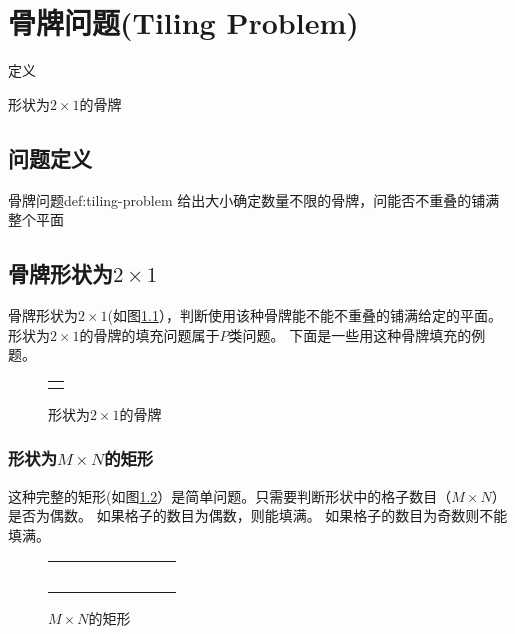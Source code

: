 \chapter{骨牌问题(Tiling Problem)}

\begin{introduction}
    \item 定义
    \item 形状为$2\times1$的骨牌
\end{introduction}

\section{问题定义}\label{sec:tiling-1}
\begin{definition}{骨牌问题}{def:tiling-problem}
    给出大小确定数量不限的骨牌，问能否不重叠的铺满整个平面
\end{definition}

\section{骨牌形状为\texorpdfstring{$2\times1$}{}}\label{sec:tiling-2}
    骨牌形状为$2\times1$(如图\ref{fig:tiling-1}），判断使用该种骨牌能不能不重叠的铺满给定的平面。
    形状为$2\times1$的骨牌的填充问题属于$P$类问题。
    下面是一些用这种骨牌填充的例题。
    \begin{figure}[hbt!]
        \centering
        \begin{tabular}{|c|}
            \hline
            \\ \hline
            \\ \hline
        \end{tabular}
        \caption{形状为$2\times1$的骨牌}
        \label{fig:tiling-1}
    \end{figure}
\subsection{形状为\texorpdfstring{$M\times N$}{}的矩形}\label{subsec:tiling-2-1}
    这种完整的矩形(如图\ref{fig:tiling-2}）是简单问题。只需要判断形状中的格子数目（$M\times N$）是否为偶数。
    如果格子的数目为偶数，则能填满。
    如果格子的数目为奇数则不能填满。
    \begin{figure}[hbt!]
        \centering
        \begin{tabular}{|c|c|c|c@{\dots}c|c|c|c|}
            \cline{1-3} \cline{6-8}
            & & & & & & & \\ 
            \cline{1-3} \cline{6-8}
            & & & & & & & \\ 
            \cline{1-3} \cline{6-8}
            \multicolumn{3}{c}{}& &\multicolumn{3}{c}{} \\
            \cline{1-3} \cline{6-8}
            & & & & & & & \\ 
            \cline{1-3} \cline{6-8}
            & & & & & & & \\ 
            \cline{1-3} \cline{6-8}
        \end{tabular}
        \caption{$M\times N$的矩形}\label{fig:tiling-2}
    \end{figure}


